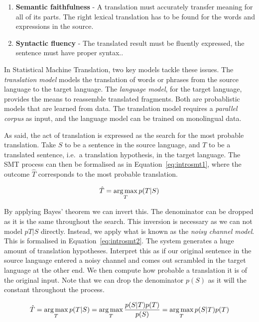 \begin{enumerate}
	\item \textbf{Semantic faithfulness} - A translation must accurately transfer meaning for all of its parts. The right lexical translation has to be found for the words and expressions in the source.
	\item \textbf{Syntactic fluency} - The translated result must be fluently expressed, the sentence must have proper syntax..
\end{enumerate}

In Statistical Machine Translation, two key models tackle these issues. The
\emph{translation model} models the translation of words or phrases from the
source language to the target language. The \emph{language model}, for the
target language, provides the means to reassemble translated fragments. Both
are probablistic models that are learned from data. The translation model
requires a \emph{parallel corpus} as input, and the language model can be
trained on monolingual data.

As said, the act of translation is expressed as the search for the most
probable translation. Take $S$ to be a sentence in the source language, and $T$
to be a translated sentence, i.e.\ a translation hypothesis, in the target
language. The SMT process can then be formalised as in
Equation~\ref{eq:introsmt1}, where the outcome $\hat{T}$ corresponds to the most probable translation.

\begin{equation}
\hat{T} = \operatorname*{arg\,max}_T p(T|S) 
\label{eq:introsmt1}
\end{equation}

By applying Bayes' theorem we can invert this. The denominator can be dropped
as it is the same throughout the search. This inversion is necessary as we can
not model $p{T|S}$ directly. Instead, we apply what is known as the \emph{noisy
channel model}. This is formalised in Equation~\ref{eq:introsmt2}. The system
generates a huge amount of translation hypotheses. Interpret this as if our
original sentence in the source language entered a noisy channel and comes out
scrambled in the target language at the other end. We then compute how probable
a translation it is of the original input. Note that we can drop the
denominator $p(S)$ as it will the constant throughout the process.

\begin{equation}
\hat{T} = \operatorname*{arg\,max}_T p(T|S) = \operatorname*{arg\,max}_T \frac{p(S|T)p(T)}{p(S)} = \operatorname*{arg\,max}_T p(S|T)p(T)
\label{eq:introsmt2}
\end{equation}


